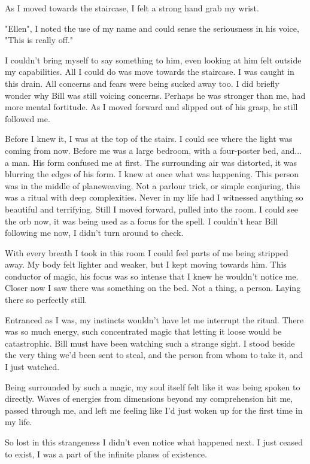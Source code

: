As I moved towards the staircase, I felt a strong hand grab my wrist.

\begin{dialogue}
    \item{"Ellen", I noted the use of my name and could sense the seriousness in his voice, "This is really off."}
\end{dialogue}

I couldn't bring myself to say something to him, even looking at him felt
outside my capabilities. All I could do was move towards the staircase. I was
caught in this drain. All concerns and fears were being sucked away too. I did
briefly wonder why Bill was still voicing concerns. Perhaps he was stronger than
me, had more mental fortitude. As I moved forward and slipped out of his grasp,
he still followed me.

Before I knew it, I was at the top of the stairs. I could see where the light
was coming from now. Before me was a large bedroom, with a four-poster bed,
and... a man. His form confused me at first. The surrounding air was distorted, it
was blurring the edges of his form. I knew at once what was happening. This
person was in the middle of planeweaving. Not a parlour trick, or simple
conjuring, this was a ritual with deep complexities. Never in my life had I
witnessed anything so beautiful and terrifying. Still I moved forward, pulled
into the room. I could see the orb now, it was being used as a focus for the
spell. I couldn't hear Bill following me now, I didn't turn around to check. 

With every breath I took in this room I could feel parts of me being stripped
away. My body felt lighter and weaker, but I kept moving towards him. This
conductor of magic, his focus was so intense that I knew he wouldn't notice me.
Closer now I saw there was something on the bed. Not a thing, a person. Laying
there so perfectly still. 

Entranced as I was, my instincts wouldn't have let me interrupt the ritual.
There was so much energy, such concentrated magic that letting it loose would be
catastrophic. Bill must have been watching such a strange sight. I stood beside
the very thing we'd been sent to steal, and the person from whom to take it, and
I just watched. 

Being surrounded by such a magic, my soul itself felt like it was being spoken
to directly. Waves of energies from dimensions beyond my comprehension hit me,
passed through me, and left me feeling like I'd just woken up for the first time
in my life. 

So lost in this strangeness I didn't even notice what happened next. I just
ceased to exist, I was a part of the infinite planes of existence.

